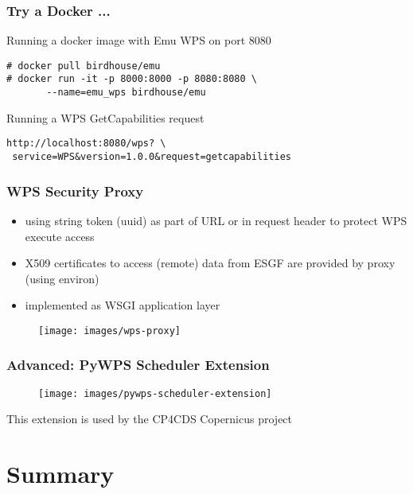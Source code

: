 \documentclass{beamer}
\begin{document}
\begin{frame}
  \frametitle<presentation>{Try a Docker ...}
  Running a docker image with Emu WPS on port 8080
    \begin{verbatim}
# docker pull birdhouse/emu
# docker run -it -p 8000:8000 -p 8080:8080 \
       --name=emu_wps birdhouse/emu
    \end{verbatim}
  Running a WPS GetCapabilities request
    \begin{verbatim}
http://localhost:8080/wps? \
 service=WPS&version=1.0.0&request=getcapabilities
    \end{verbatim}
\end{frame}

\begin{frame}
  \frametitle{WPS Security Proxy}
  \begin{itemize}
    \item using string token (uuid) as part of URL or in request header to protect WPS execute access
    \item X509 certificates to access (remote) data from ESGF are provided by proxy (using environ)
    \item implemented as WSGI application layer
  \end{itemize}
  \begin{figure}
    \texttt{[image: images/wps-proxy]}
  \end{figure}
\end{frame}

\begin{frame}
\frametitle<presentation>{Advanced: PyWPS Scheduler Extension}

  \begin{figure}[ht]
    \centering
    \texttt{[image: images/pywps-scheduler-extension]}
  \end{figure}

  \centering
  \footnotesize{This extension is used by the CP4CDS Copernicus project}

\end{frame}


\section{Summary}
\end{document}
